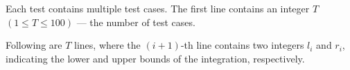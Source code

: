 Each test contains multiple test cases. The first line contains an integer $T$ $(1\le T\le 100)$ --- the number of test cases.

Following are $T$ lines, where the $(i+1)$-th line contains two integers $l_i$ and $r_i$, indicating the lower and upper bounds of the integration, respectively.
